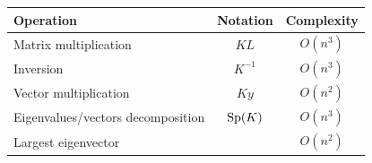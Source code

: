 \documentclass[toc, titlepaged]{../cs-classes/cs-classes}
\begin{document}
\begin{figure}[H]
    \centering
    \begin{tabular}{|l|c|c|}
        \hline
        \bf Operation & \bf Notation & \bf Complexity\\
        \hline\hline
        Matrix multiplication & $KL$ & $O(n^3)$\\\hline
        Inversion & $K^{-1}$ & $O(n^3)$\\\hline
        Vector multiplication & $Ky$ & $O(n^2)$\\\hline
        Eigenvalues/vectors decomposition & $\textnormal{Sp}(K)$ & $O(n^3)$\\\hline
        Largest eigenvector & & $O(n^2)$\\\hline
    \end{tabular}
\end{figure}
\end{document}
